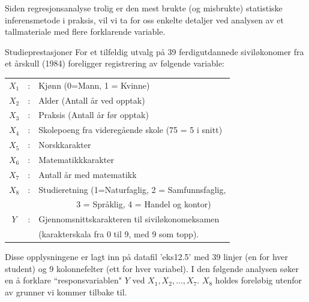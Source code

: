 Siden regresjonsanalyse trolig er den mest brukte (og misbrukte) statistiske
inferensmetode i praksis, vil vi ta for oss enkelte detaljer ved analysen av
et tallmateriale med flere forklarende variable.\\

\begin{eksempel}{Studieprestasjoner}
For et tilfeldig utvalg på 39 ferdigutdannede siviløkonomer fra et 
årskull (1984) foreligger registrering av følgende variable:

\begin{center}
\begin{tabular}{ccl}
 $X_1$ &:& Kjønn (0=Mann, 1 = Kvinne)  \\
 $X_2$ &:& Alder (Antall år ved opptak) \\
 $X_3$ &:& Praksis (Antall år før opptak) \\
 $X_4$ &:& Skolepoeng fra videregående skole (75 = 5 i snitt) \\
 $X_5$ &:& Norsk\-karakter \\
 $X_6$ &:& Matematikk\-karakter \\
 $X_7$ &:& Antall år med matematikk \\
 $X_8$ &:& Studieretning (1=Naturfaglig, 2 = Samfunnsfaglig, \\
       & & \mbox{\ \ \ \ \ \ \ \ \ }3 = Språklig, 4 = Handel og kontor) \\
   $Y$ &:& Gjennomsnittskarakteren til siviløkonomeksamen \\
       & &(karakterskala fra 0 til 9, med 9 som topp). 
\end{tabular}
\end{center}

\noindent Disse opplysningene er lagt inn på datafil 'eks12.5' med 39
 linjer (en for hver student) og 9 kolonnefelter (ett for hver variabel). I den
følgende analysen søker en å forklare ``responsvariablen" $Y$ ved
$X_1,X_2,\ldots , X_7$. $X_8$ holdes foreløbig utenfor av grunner vi kommer
 tilbake til.


\end{eksempel}
